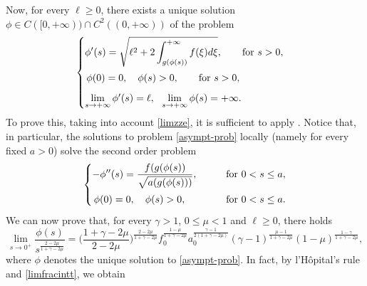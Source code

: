 \documentclass[10pt]{amsart}
\numberwithin{equation}{section}
\theoremstyle{definition}
\begin{document}
Now, for every $\ell\geq 0$, there exists a 
unique solution $\phi\in C([0,+\infty))\cap C^2((0,+\infty))$ of the problem
\begin{equation}
	\begin{cases}
	\label{asympt-prob}
	\displaystyle
\phi'(s)=\sqrt{\ell^2+2\int_{g(\phi(s))}^{+\infty}f(\xi)d\xi}, \qquad \text{for $s>0$}, & \\
\noalign{\vskip4pt}
\, \phi(0)=0, \quad \phi(s)>0, \qquad\text{for $s>0$}, & \\
\noalign{\vskip6pt}
\lim\limits_{s\to+\infty}\phi'(s)=\ell,\,\,\,\,  \lim\limits_{s\to+\infty}\phi(s)=+\infty. & 
\end{cases}
\end{equation}
To prove this, taking into account \eqref{limzze}, it is sufficient to apply \cite[Lemma 1.3]{zhangcheng}.
Notice that, in particular, the solutions to problem \eqref{asympt-prob} locally (namely for every fixed $a>0$) 
solve the second order problem
\begin{equation}
	\begin{cases}
	\label{asympt-prob-ii}
	\displaystyle
-\phi''(s)=\frac{f(g(\phi(s))}{\sqrt{a(g(\phi(s)))}}, \qquad & \text{for $0<s\leq a$}, \\
\noalign{\vskip4pt}
\, \phi(0)=0, \quad \phi(s)>0, & \text{for $0<s\leq a$}.
\end{cases}
\end{equation}
We can now prove that, for every $\gamma>1$, $0\leq\mu<1$ and $\ell\geq 0$, there holds
\begin{equation}
	\label{zerobeh}
\lim_{s\to 0^+}\frac{\phi(s)}{s^{\frac{2-2\mu}{1+\gamma-2\mu}}}=
\Big(\frac{1+\gamma-2\mu}{2-2\mu}\Big)^{\frac{2-2\mu}{1+\gamma-2\mu}}		
f_0^{\frac{1-\mu}{1+\gamma-2\mu}} a_0^{\frac{\gamma-1}{2(1+\gamma-2\mu)}}(\gamma-1)^{\frac{\mu-1}{1+\gamma-2\mu}} 
	(1-\mu)^{\frac{1-\gamma}{1+\gamma-2\mu}},
\end{equation}
where $\phi$ denotes the unique solution to \eqref{asympt-prob}. 
In fact, by l'H\^ opital's rule and \eqref{limfracintt}, we obtain
\end{document}
